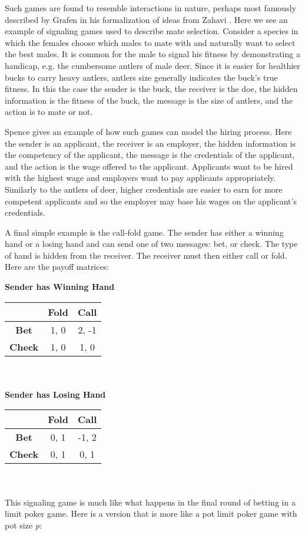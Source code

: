 \documentclass{article}
\begin{document}
Such games are found to resemble interactions in nature, perhaps most famously described by Grafen \cite{grafen1} in his formalization of ideas from Zahavi \cite{zahavi1}. Here we see an example of signaling games used to describe mate selection. Consider a species in which the females choose which males to mate with and naturally want to select the best males. It is common for the male to signal his fitness by demonstrating a handicap, e.g. the cumbersome antlers of male deer. Since it is easier for healthier bucks to carry heavy antlers, antlers size generally indicates the buck's true fitness. In this the case the sender is the buck, the receiver is the doe, the hidden information is the fitness of the buck, the message is the size of antlers, and the action is to mate or not. 

Spence \cite{spence1} gives an example of how such games can model the hiring process. Here the sender is an applicant, the receiver is an employer, the hidden information is the competency of the applicant, the message is the credentials of the applicant, and the action is the wage offered to the applicant. Applicants want to be hired with the highest wage and employers want to pay applicants appropriately. Similarly to the antlers of deer, higher credentials are easier to earn for more competent applicants and so the employer may base his wages on the applicant's credentials.

A final simple example is the call-fold game. The sender has either a winning hand or a losing hand and can send one of two messages: bet, or check. The type of hand is hidden from the receiver. The receiver must then either call or fold. Here are the payoff matrices:

\textbf{Sender has Winning Hand}\\
\begin{tabular}{c | c | c} & \textbf{Fold} & \textbf{Call} \\ \hline \textbf{Bet} & 1, 0 & 2, -1 \\ \hline  \textbf{Check} & 1, 0 & 1, 0 \end{tabular}
\\ \\
\textbf{Sender has Losing Hand}\\
\begin{tabular}{c | c | c} & \textbf{Fold} & \textbf{Call} \\ \hline \textbf{Bet} & 0, 1 & -1, 2 \\ \hline  \textbf{Check} & 0, 1 & 0, 1 \end{tabular}
\\ \\
This signaling game is much like what happens in the final round of betting in a limit poker game. Here is a version that is more like a pot limit poker game with pot size \emph{p}:\\
\end{document}
